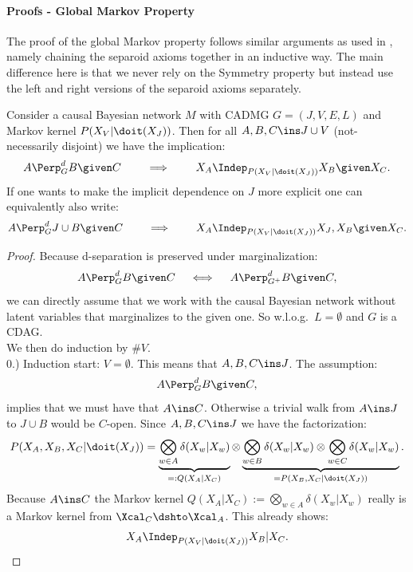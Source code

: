 \paragraph{Proofs - Global Markov Property }\hfill

The proof of the global Markov property follows similar arguments as used in \cite{Lau90, Ver93, Ric03, FM17, FM18, RERS17}, 
namely chaining the separoid axioms together in an inductive way.
The main difference here is that we never rely on the Symmetry property but instead use 
the left and right versions of the separoid axioms separately.


\begin{Thm}
\label{GMP-CCBN}
Consider a causal Bayesian network $M$ with \observational CADMG $G=(J,V,E,L)$ 
and \observational Markov kernel $P(X_V|\doit(X_J))$.
Then for all $A, B, C \ins J \cup V$ (not-necessarily disjoint) we have the implication:
\[ A \Perp^d_G B \given C \qquad \implies \qquad X_A \Indep_{P(X_V|\doit(X_J))} X_B \given X_C.   \]
If one wants to make the implicit dependence on $J$ more explicit one can equivalently also write:
\[ A \Perp^d_G J \cup B \given C \qquad \implies \qquad X_A \Indep_{P(X_V|\doit(X_J))} X_J,X_{B} \given X_C.   \]
\begin{proof}
Because d-separation is preserved under marginalization:
\[ A \Perp^d_G B \given C \quad \iff \quad A \Perp^d_{G^+} B \given C,   \]
we can directly assume that we work with the causal Bayesian network without latent variables that marginalizes to the given one.
So w.l.o.g.\ $L=\emptyset$ and $G$ is a CDAG.\\
We then do induction by $\#V$. \\


0.) Induction start:  $V= \emptyset$. This means that $A,B,C \ins J$.
The assumption: 
\[A \Perp^d_G  B \given C,\] 
implies that we must have that $A \ins C$. Otherwise a trivial walk from $A \ins J$ to $J \cup B$ would be $C$-open.
Since $A,B,C \ins J$ we have the factorization:
\[ P(X_A,X_B,X_C|\doit(X_J)) = \underbrace{\bigotimes_{w \in A} \delta(X_w|X_w)}_{=:Q(X_A|X_C)} \otimes 
 \underbrace{\bigotimes_{w \in B} \delta(X_w|X_w) \otimes \bigotimes_{w \in C} \delta(X_w|X_w)}_{=P(X_B,X_C|\doit(X_J))}.  \]
 Because $A \ins C$ the Markov kernel $Q(X_A|X_C):= \bigotimes_{w \in A} \delta(X_w|X_w) $ 
 really is a Markov kernel from $\Xcal_C \dshto \Xcal_A$.
This already shows:
\[ X_A \Indep_{P(X_V|\doit(X_J))} X_B |X_C.\]


\end{proof}
\end{Thm}
